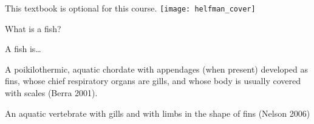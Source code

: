 \documentclass[t]{beamer}
\begin{document}
{
	\begin{frame}[t]
	\end{frame}
}

%
%	
%
%
%	
%	
%	
%	
%

%
%	
%
%
%
%	
%	
%	
%
\begin{frame}[t,plain]{This textbook is optional for this course.}
	\centering
		\texttt{[image: helfman\_cover]} 
\end{frame}


{
\begin{frame}[t,plain]{What is a fish?}
\end{frame}
}


\begin{frame}[t,plain]{A fish is\dots}

	\hangpara A poikilothermic, aquatic chordate with appendages (when present) developed as fins, whose chief respiratory organs are gills, and whose body is usually covered with scales (Berra 2001).

	\hangpara An aquatic vertebrate with gills and with limbs in the shape of fins (Nelson 2006)

\end{frame}
\end{document}
